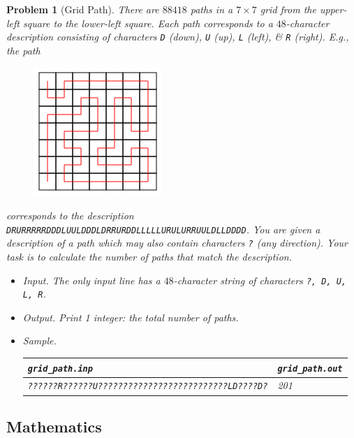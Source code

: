 \documentclass{article}
\newtheorem{problem}{Problem}
\begin{document}
\begin{problem}[Grid Path]
	There are $88418$ paths in a $7\times7$ grid from the upper-left square to the lower-left square. Each path corresponds to a $48$-character description consisting of characters {\tt D} (down), {\tt U} (up), {\tt L} (left), \& {\tt R} (right). E.g., the path
	\begin{figure}[H]
		\centering
		\includegraphics[scale=.5]{grid_path}
	\end{figure}
	\noindent corresponds to the description {\tt DRURRRRRDDDLUULDDDLDRRURDDLLLLLURULURRUULDLLDDDD}. You are given a description of a path which may also contain characters {\tt?} (any direction). Your task is to calculate the number of paths that match the description.
	\begin{itemize}
		\item {\sf Input.} The only input line has a $48$-character string of characters {\tt?, D, U, L, R}.
		\item {\sf Output.} Print 1 integer: the total number of paths.
		\item {\sf Sample.}
		\begin{table}[H]
			\centering
			\begin{tabular}{|l|l|}
				\hline
				\verb|grid_path.inp| & \verb|grid_path.out| \\
				\hline
				{\tt??????R??????U??????????????????????????LD????D?} & 201 \\
				\hline
			\end{tabular}
		\end{table}
	\end{itemize}
\end{problem}


\subsection{Mathematics}
\end{document}
